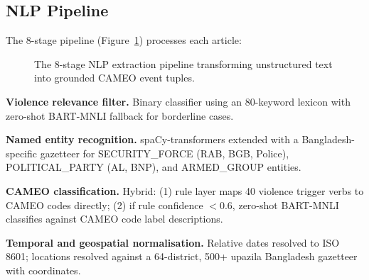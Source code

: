 \documentclass[11pt,a4paper]{article}
\begin{document}
\subsection{NLP Pipeline}
The 8-stage pipeline (Figure~\ref{fig:nlp}) processes each article:

\begin{figure}[t]
\centering
{}
\caption{The 8-stage NLP extraction pipeline transforming unstructured text into grounded CAMEO event tuples.}
\label{fig:nlp}
\end{figure}

\noindent
\textbf{Violence relevance filter.}
Binary classifier using an 80-keyword lexicon with zero-shot
BART-MNLI fallback \citep{yin2019} for borderline cases.

\noindent
\textbf{Named entity recognition.}
spaCy-transformers \citep{honnibal2020} extended with a
Bangladesh-specific gazetteer for SECURITY\_FORCE (RAB, BGB, Police),
POLITICAL\_PARTY (AL, BNP), and ARMED\_GROUP entities.

\noindent
\textbf{CAMEO classification.}
Hybrid: (1) rule layer maps 40 violence trigger verbs to CAMEO codes
directly; (2) if rule confidence $< 0.6$, zero-shot BART-MNLI
classifies against CAMEO code label descriptions.

\noindent
\textbf{Temporal and geospatial normalisation.}
Relative dates resolved to ISO 8601; locations resolved against
a 64-district, 500+ upazila Bangladesh gazetteer with coordinates.
\end{document}
